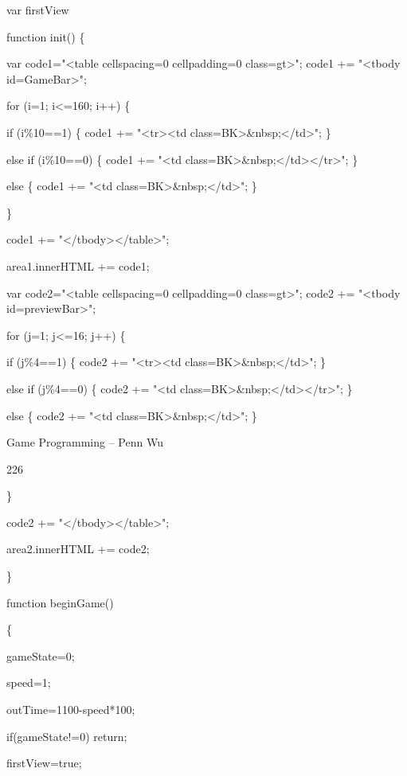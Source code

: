 \documentclass[
]{article}
\begin{document}
var firstView

function init() \{

var code1="\textless table cellspacing=0 cellpadding=0
class=gt\textgreater"; code1 += "\textless tbody
id=\textquotesingle GameBar\textquotesingle\textgreater";

for (i=1; i\textless=160; i++) \{

if (i\%10==1) \{ code1 += "\textless tr\textgreater\textless td
class=BK\textgreater\&nbsp;\textless/td\textgreater"; \}

else if (i\%10==0) \{ code1 += "\textless td
class=BK\textgreater\&nbsp;\textless/td\textgreater\textless/tr\textgreater";
\}

else \{ code1 += "\textless td
class=BK\textgreater\&nbsp;\textless/td\textgreater"; \}

\}

code1 += "\textless/tbody\textgreater\textless/table\textgreater";

area1.innerHTML += code1;

var code2="\textless table cellspacing=0 cellpadding=0
class=gt\textgreater"; code2 += "\textless tbody
id=\textquotesingle previewBar\textquotesingle\textgreater";

for (j=1; j\textless=16; j++) \{

if (j\%4==1) \{ code2 += "\textless tr\textgreater\textless td
class=BK\textgreater\&nbsp;\textless/td\textgreater"; \}

else if (j\%4==0) \{ code2 += "\textless td
class=BK\textgreater\&nbsp;\textless/td\textgreater\textless/tr\textgreater";
\}

else \{ code2 += "\textless td
class=BK\textgreater\&nbsp;\textless/td\textgreater"; \}

Game Programming -- Penn Wu

226

\protect\hypertarget{index_split_011.htmlux5cux23p227}{}{} \}

code2 += "\textless/tbody\textgreater\textless/table\textgreater";

area2.innerHTML += code2;

\}

function beginGame()

\{

gameState=0;

speed=1;

outTime=1100-speed*100;

if(gameState!=0) return;

firstView=true;
\end{document}
